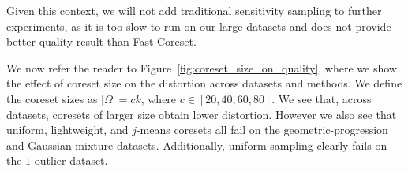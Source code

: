  Given this context, we will not add traditional sensitivity sampling to further experiments, as it is too slow to run on our large datasets and does not provide better quality result than Fast-Coreset.

We now refer the reader to Figure~\ref{fig:coreset_size_on_quality}, where we show the effect of coreset size on the distortion across datasets and methods.
We define the coreset sizes as $|\Omega| = ck$, where $c \in [20, 40, 60, 80]$. We see that, across datasets, coresets of larger size obtain lower distortion. However
we also see that uniform, lightweight, and $j$-means coresets all fail on the geometric-progression and Gaussian-mixture datasets. Additionally, uniform
sampling clearly fails on the $1$-outlier dataset.





